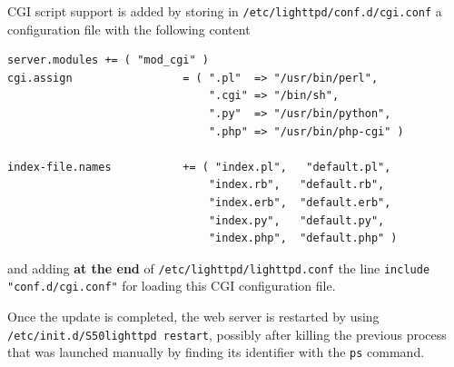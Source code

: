 \documentclass{article}
\begin{document}
{CGI script support is added by storing in {\tt /etc/lighttpd/conf.d/cgi.conf} a configuration
file with the following content
\begin{verbatim}
server.modules += ( "mod_cgi" )
cgi.assign                 = ( ".pl"  => "/usr/bin/perl",
                               ".cgi" => "/bin/sh",
                               ".py"  => "/usr/bin/python",
                               ".php" => "/usr/bin/php-cgi" )

index-file.names           += ( "index.pl",   "default.pl",
                               "index.rb",   "default.rb",
                               "index.erb",  "default.erb",
                               "index.py",   "default.py",
                               "index.php",  "default.php" )
\end{verbatim}

and adding {\bf at the end} of {\tt /etc/lighttpd/lighttpd.conf} the line 
{\tt include "conf.d/cgi.conf"} for loading this CGI configuration file.

Once the update is completed, the web server is restarted by using
{\tt /etc/init.d/S50lighttpd restart}, possibly after killing the previous process
that was launched manually by finding its identifier with the {\tt ps} command. 



}
\end{document}
